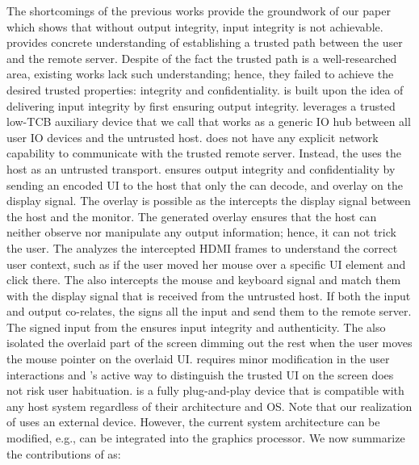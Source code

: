  
 The shortcomings of the previous works provide the groundwork of our paper which shows that without output integrity, input integrity is not achievable. \name provides concrete understanding of establishing a trusted path between the user and the remote server. Despite of the fact the trusted path is a well-researched area, existing works lack such understanding; hence, they failed to achieve the desired trusted properties: integrity and confidentiality. \name is built upon the idea of delivering input integrity by first ensuring output integrity. \name leverages a trusted low-TCB auxiliary device that we call \device that works as a generic IO hub between all user IO devices and the untrusted host. \device does not have any explicit network capability to communicate with the trusted remote server. Instead, the \device uses the host as an untrusted transport. \device ensures output integrity and confidentiality by sending an encoded UI to the host that only the \device can decode, and overlay on the display signal. The overlay is possible as the \device intercepts the display signal between the host and the monitor. The \device generated overlay ensures that the host can neither observe nor manipulate any output information; hence, it can not trick the user. The \device analyzes the intercepted HDMI frames to understand the correct user context, such as if the user moved her mouse over a specific UI element and click there. The \device also intercepts the mouse and keyboard signal and match them with the display signal that is received from the untrusted host. If both the input and output co-relates, the \device signs all the input and send them to the remote server. The signed input from the \device ensures input integrity and authenticity. The \device also isolated the overlaid part of the screen dimming out the rest when the user moves the mouse pointer on the overlaid UI. \name requires minor modification in the user interactions and \name's active way to distinguish the trusted UI on the screen does not risk user habituation. \device is a fully plug-and-play device that is compatible with any host system regardless of their architecture and OS. Note that our realization of \name uses an external device. However, the current system architecture can be modified, e.g., \device can be integrated into the graphics processor. We now summarize the contributions of \name as: 



